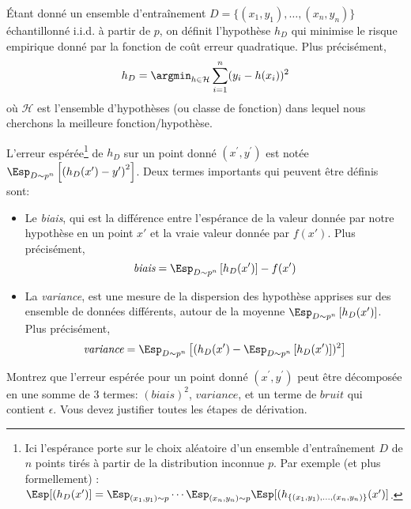 {Étant donné un ensemble d'entraînement $D=\{({x}_1, y_1),\dots,({x}_n, y_n)\}$ échantillonné i.i.d. à partir de $p$, on définit l'hypothèse $h_D$ qui minimise le risque empirique donné par la fonction de coût erreur quadratique. Plus précisément,
$$
	h_D= \argmin_{h\in \mathcal H}  \sum_{i=1}^n (y_i - h({x}_i))^2
$$
où $\mathcal H$ est l'ensemble d'hypothèses (ou classe de fonction) dans lequel nous cherchons la meilleure fonction/hypothèse.

L'erreur espérée\footnote{Ici l'espérance porte sur le choix aléatoire d'un ensemble d'entraînement $D$ de $n$ points tirés à partir de la distribution inconnue $p$. Par exemple (et plus formellement) : $\Esp[(h_D({x'})] = \Esp_{(x_1,y_1)\sim p} \cdots \Esp_{(x_n,y_n)\sim p} \Esp[(h_{\{({x}_1, y_1),\dots,({x}_n, y_n)\}}({x'})]$.} de $h_D$ sur un point donné $(x^{\prime}, y^{\prime})$ est notée $\Esp_{D \sim p^n} \left[\left(h_{D}(x^{\prime}) - y^{\prime}\right)^{2}\right]$. Deux termes importants qui peuvent être définis sont:
\begin{itemize}
	\item Le \emph{biais}, qui est la différence entre l'espérance de la valeur donnée par notre hypothèse en un point ${ x}'$ et la vraie valeur donnée par  $f({x'})$. Plus précisément,
	      $$
		      \textit{biais}= \Esp_{D \sim p^n}\left[h_D({x^{\prime}})\right]-f({x^{\prime}})
	      $$
	\item La \emph{variance}, est une mesure de la dispersion des hypothèse apprises sur des ensemble de données différents, autour de la moyenne $\Esp_{D \sim p^n}\left[h_D({x^{\prime}})\right]$. Plus précisément,
	      $$
		      \textit{variance}= \Esp_{D \sim p^n}\left[(h_D({x^{\prime}}) - \Esp_{D \sim p^n}\left[h_D({x^{\prime}})\right])^2\right]
	      $$
\end{itemize}

Montrez que l'erreur espérée pour un point donné $({x^{\prime}},y^{\prime})$ peut être décomposée en une somme de 3 termes: $(\textit{biais})^2$, $\textit{variance}$, et un terme de $\textit{bruit}$ qui contient $\epsilon$. Vous devez justifier toutes les étapes de dérivation.
}

\newpage

